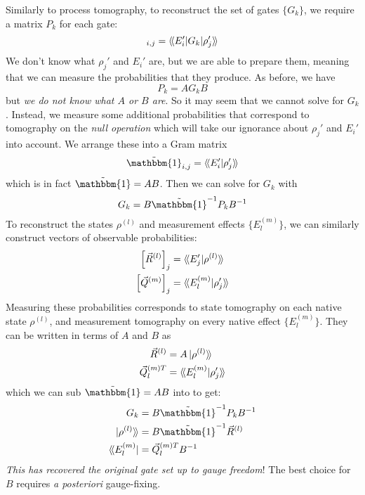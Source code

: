 Similarly to process tomography, to reconstruct the set of gates $\{G_k\}$, we require a matrix
$P_k$ for each gate:
\begin{equation}
    [P_k]_{i,j} = \superbraket{E_i' | G_k | \rho_j'}
\end{equation}
We don't know what $\rho_j'$ and $E_i'$ are, but we are able to prepare them, meaning that we can
measure the probabilities that they produce. As before, we have
\begin{equation}
    P_k = A G_k B
\end{equation}
but \textit{we do not know what $A$ or $B$ are}. So it may seem that we cannot solve for $G_k$.
Instead, we measure some additional probabilities that correspond to tomography on the \textit{null
operation} which will take our ignorance about $\rho_j'$ and $E_i'$ into account. We arrange these
into a Gram matrix
\begin{equation}
    \tilde{\mathbbm{1}}_{i, j} = \superbraket{E_i' | \rho_j'}
\end{equation}
which is in fact $\tilde{\mathbbm{1}} = AB$. Then we can solve for $G_k$ with
\begin{equation}
    G_k = B \tilde{\mathbbm{1}}^{-1} P_k B^{-1}
\end{equation}
To reconstruct the states $\rho^{(l)}$ and measurement effects $\{E_l^{(m)}\}$, we can similarly
construct vectors of observable probabilities:
\begin{equation}
    \begin{aligned}
        \left[\vec{R}^{(l)}\right]_j &= \langle\!\braket{E_j' | \rho^{(l)}}\!\rangle \\
        \left[\vec{Q}^{(m)}\right]_j &= \langle\!\braket{E_l^{(m)} | \rho_j'}\!\rangle \\
    \end{aligned}
\end{equation}
Measuring these probabilities corresponds to state tomography on each native state $\rho^{(l)}$, and
measurement tomography on every native effect $\{E_l^{(m)}\}$. They can be written in terms of $A$
and $B$ as
\begin{equation}
    \begin{aligned}
        \vec{R}^{(l)} &= A \ket{\rho^{(l)}}\!\rangle \\
        \vec{Q}_l^{(m)T} &= \langle\!\braket{E_l^{(m)} | \rho_j'}\!\rangle \\
    \end{aligned}
\end{equation}
which we can sub $\tilde{\mathbbm{1}} = AB$ into to get:
\begin{align}
    G_k                   &= B \tilde{\mathbbm{1}}^{-1} P_k B^{-1} \\
    \superket{\rho^{(l)}} &= B \tilde{\mathbbm{1}}^{-1} \vec{R}^{(l)} \\
    \superbra{E_l^{(m)}}  &= \vec{Q}_l^{(m)T} B^{-1}
\end{align}
\textit{This has recovered the original gate set up to gauge freedom}! The best choice for $B$
requires \textit{a posteriori} gauge-fixing.

